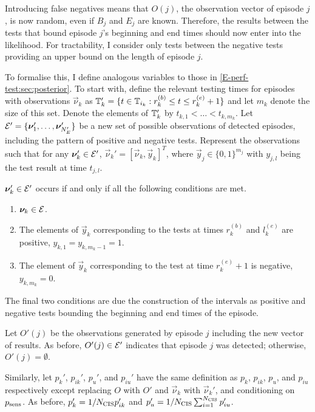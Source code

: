 \documentclass[thesis.tex]{subfiles}
\begin{document}
Introducing false negatives means that $O(j)$, the observation vector of episode $j$, is now random, even if $B_j$ and $E_j$ are known.
Therefore, the results between the tests that bound episode $j$'s beginning and end times should now enter into the likelihood.
For tractability, I consider only tests between the negative tests providing an upper bound on the length of episode $j$.

To formalise this, I define analogous variables to those in \cref{E-perf-test:sec:posterior}.
To start with, define the relevant testing times for episodes with observations $\vec{\nu}_k$ as $\mathbb{T}'_k = \{ t \in \mathbb{T}_{i_k} : r_k^{(b)} \leq t \leq r_k^{(e)} + 1 \}$ and let $m_k$ denote the size of this set.
Denote the elements of $\mathbb{T}'_k$ by $t_{k,1} < \dots < t_{k,m_k}$.
Let $\mathcal{E}' = \{ \bm{\nu}_1', \dots, \bm{\nu}_{N_E'}' \}$ be a new set of possible observations of detected episodes, including the pattern of positive and negative tests.
Represent the observations such that for any $\bm{\nu}_k' \in \mathcal{E}'$, $\vec{\nu}_k' = [\vec{\nu}_{k}, \vec{y}_k]^T$, where $\vec{y}_j \in \{ 0, 1 \}^{m_j}$ with $y_{j,l}$ being the test result at time $t_{j,l}$.

$\bm{\nu}'_k \in \mathcal{E}'$ occurs if and only if all the following conditions are met.
\begin{enumerate}
  \item $\bm{\nu}_k \in \mathcal{E}$.
  \item The elements of $\vec{y}_k$ corresponding to the tests at times $r_k^{(b)}$ and $l_k^{(e)}$ are positive, \ie $y_{k,1} = y_{k,m_k-1} = 1$.
  \item The element of $\vec{y}_k$ corresponding to the test at time $r_k^{(e)} + 1$ is negative, \ie $y_{k,m_k} = 0$.
\end{enumerate}
The final two conditions are due the construction of the intervals as positive and negative tests bounding the beginning and end times of the episode.

Let $O'(j)$ be the observations generated by episode $j$ including the new vector of results.
As before, $O'(j) \in \mathcal{E}'$ indicates that episode $j$ was detected; otherwise, $O'(j) = \emptyset$.

Similarly, let $p_k'$, $p_{ik}'$, $p_u'$, and $p_{iu}'$ have the same definition as $p_k$, $p_{ik}$, $p_u$, and $p_{iu}$ respectively except replacing $O$ with $O'$ and $\vec{\nu}_k$ with $\vec{\nu}_k'$, and conditioning on $p_\text{sens}$.
As before, $p'_k = 1/N_\text{CIS} p'_{ik}$ and $p'_u = 1/N_\text{CIS} \sum_{i=1}^{N_\text{CIS}} p'_{iu}$.
\end{document}
